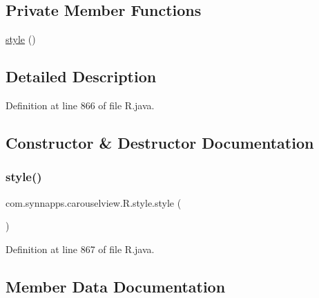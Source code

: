 \subsection*{Private Member Functions}
\begin{DoxyCompactItemize}
\item 
\mbox{\hyperlink{classcom_1_1synnapps_1_1carouselview_1_1_r_1_1style_a961db8da874e9e907f50ba2c354a43d6}{style}} ()
\end{DoxyCompactItemize}


\subsection{Detailed Description}


Definition at line 866 of file R.\+java.



\subsection{Constructor \& Destructor Documentation}
\mbox{\label{classcom_1_1synnapps_1_1carouselview_1_1_r_1_1style_a961db8da874e9e907f50ba2c354a43d6}} 
\subsubsection{\texorpdfstring{style()}{style()}}
{\footnotesize\ttfamily com.\+synnapps.\+carouselview.\+R.\+style.\+style (\begin{DoxyParamCaption}{ }\end{DoxyParamCaption})\hspace{0.3cm}{\ttfamily [private]}}



Definition at line 867 of file R.\+java.


\begin{DoxyCode}{0}

\end{DoxyCode}


\subsection{Member Data Documentation}
\mbox{\label{classcom_1_1synnapps_1_1carouselview_1_1_r_1_1style_a1944d7b5dad87f20fd0de7f390a56a42}} 
